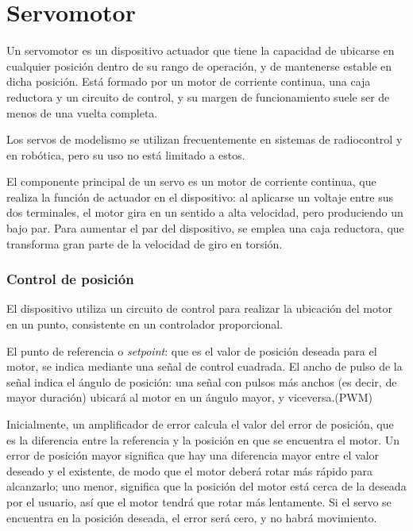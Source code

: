 \documentclass[../main]{subfiles}
\begin{document}
\chapter{Servomotor}
Un servomotor es un dispositivo actuador que tiene la capacidad de ubicarse en cualquier posición dentro de su rango de operación, y de mantenerse estable en dicha posición. Está formado por un motor de corriente continua, una caja reductora y un circuito de control, y su margen de funcionamiento suele ser de menos de una vuelta completa.

Los servos de modelismo se utilizan frecuentemente en sistemas de radiocontrol y en robótica, pero su uso no está limitado a estos.

El componente principal de un servo es un motor de corriente continua, que realiza la función de actuador en el dispositivo: al aplicarse un voltaje entre sus dos terminales, el motor gira en un sentido a alta velocidad, pero produciendo un bajo par. Para aumentar el par del dispositivo, se emplea una caja reductora, que transforma gran parte de la velocidad de giro en torsión.


\subsection{Control de posición}


El dispositivo utiliza un circuito de control para realizar la ubicación del motor en un punto, consistente en un controlador proporcional.

El punto de referencia o \emph{setpoint}: que es el valor de posición deseada para el motor, se indica mediante una señal de control cuadrada. El ancho de pulso de la señal indica el ángulo de posición: una señal con pulsos más anchos (es decir, de mayor duración) ubicará al motor en un ángulo mayor, y viceversa.(PWM)


Inicialmente, un amplificador de error calcula el valor del error de posición, que es la diferencia entre la referencia y la posición en que se encuentra el motor. Un error de posición mayor significa que hay una diferencia mayor entre el valor deseado y el existente, de modo que el motor deberá rotar más rápido para alcanzarlo; uno menor, significa que la posición del motor está cerca de la deseada por el usuario, así que el motor tendrá que rotar más lentamente. Si el servo se encuentra en la posición deseada, el error será cero, y no habrá movimiento.
\end{document}
